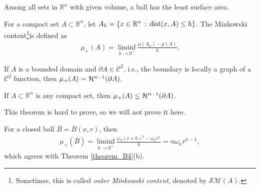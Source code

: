 \begin{theorem}[{\bf Isoperimetric}]\label{theorem_d1}
Among all sets in $\mathbb{R}^n$ with given volume, a ball has the least surface area.
\end{theorem}

\medskip

\begin{definition}
For a compact set $A \subset \mathbb{R}^n$, let $A_h = \{x \in \mathbb{R}^n \,:\, {\operatorname{dist}}(x,A) \leq h\}$. The Minkowski content\footnote{Sometimes, this is called {\em outer Minkowski content}, denoted by $\mathcal{SM}(A)$\cite{32}.}is defined as 
\begin{align*}
    \mu_+(A) = \liminf_{h \to 0^+} \frac{\mu(A_n) - \mu(A)}{h}.
\end{align*}
\end{definition}

\medskip

\begin{theorem}
If $A$ is a bounded domain and $\partial A \in \mathcal{C}^2$, i.e., the boundary is locally a graph of a $\mathcal{C}^2$ function, then $\mu_+(A) = {\mathcal H}^{n-1}(\partial A)$.
\end{theorem}

\medskip

\begin{theorem}
If $A \subset \mathbb{R}^n$ is any compact set, then $\mu_+(A) \leq {\mathcal H}^{n-1}(\partial A)$.
\end{theorem}

\medskip

This theorem is hard to prove, so we will not prove it here.

\medskip

\begin{example}
For a closed ball $\overline{B} = \overline{B}(x,r)$, then \begin{align*}
    \mu_+(\overline{B}) = \liminf_{h \to 0^+} \frac{\omega_n(r+h)^n - \omega_n r^n}{h} = n \omega_n r^{n-1},
\end{align*}
which agrees with Theorem \ref{theorem_B4}(b).
\end{example}

\medskip

